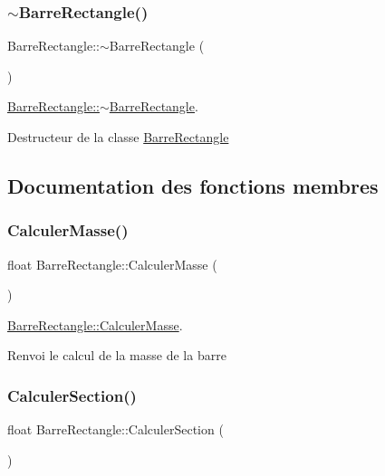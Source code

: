 \subsubsection{\texorpdfstring{$\sim$\+Barre\+Rectangle()}{~BarreRectangle()}}
{\footnotesize\ttfamily Barre\+Rectangle\+::$\sim$\+Barre\+Rectangle (\begin{DoxyParamCaption}{ }\end{DoxyParamCaption})}



\hyperlink{class_barre_rectangle_aaf9fee36e7a6b914af9fc0bff25674e4}{Barre\+Rectangle\+::$\sim$\+Barre\+Rectangle}. 

Destructeur de la classe \hyperlink{class_barre_rectangle}{Barre\+Rectangle} 

\subsection{Documentation des fonctions membres}
\mbox{\label{class_barre_rectangle_a9edb62e31a33790146eb0fd2b3fd7e4e}} 
\subsubsection{\texorpdfstring{Calculer\+Masse()}{CalculerMasse()}}
{\footnotesize\ttfamily float Barre\+Rectangle\+::\+Calculer\+Masse (\begin{DoxyParamCaption}{ }\end{DoxyParamCaption})}



\hyperlink{class_barre_rectangle_a9edb62e31a33790146eb0fd2b3fd7e4e}{Barre\+Rectangle\+::\+Calculer\+Masse}. 

Renvoi le calcul de la masse de la barre \mbox{\label{class_barre_rectangle_aca359a79b9e74a94867ccaa4341f51ae}} 
\subsubsection{\texorpdfstring{Calculer\+Section()}{CalculerSection()}}
{\footnotesize\ttfamily float Barre\+Rectangle\+::\+Calculer\+Section (\begin{DoxyParamCaption}{ }\end{DoxyParamCaption})}



